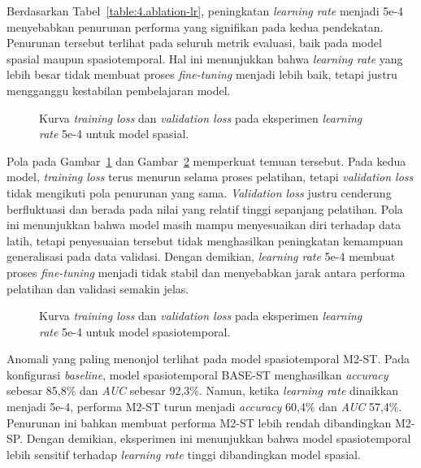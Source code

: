 Berdasarkan Tabel~\ref{table:4.ablation-lr}, peningkatan \textit{learning rate} menjadi 5e-4 menyebabkan penurunan performa yang signifikan pada kedua pendekatan. Penurunan tersebut terlihat pada seluruh metrik evaluasi, baik pada model spasial maupun spasiotemporal. Hal ini menunjukkan bahwa \textit{learning rate} yang lebih besar tidak membuat proses \textit{fine-tuning} menjadi lebih baik, tetapi justru mengganggu kestabilan pembelajaran model.

\begin{figure}[htbp]
\centering
{}
\caption{Kurva \textit{training loss} dan \textit{validation loss} pada eksperimen \textit{learning rate} 5e-4 untuk model spasial.}
\label{fig:4.ablation-lr-loss-spatial}
\end{figure}

Pola pada Gambar~\ref{fig:4.ablation-lr-loss-spatial} dan Gambar~\ref{fig:4.ablation-lr-loss-spatiotemporal} memperkuat temuan tersebut. Pada kedua model, \textit{training loss} terus menurun selama proses pelatihan, tetapi \textit{validation loss} tidak mengikuti pola penurunan yang sama. \textit{Validation loss} justru cenderung berfluktuasi dan berada pada nilai yang relatif tinggi sepanjang pelatihan. Pola ini menunjukkan bahwa model masih mampu menyesuaikan diri terhadap data latih, tetapi penyesuaian tersebut tidak menghasilkan peningkatan kemampuan generalisasi pada data validasi. Dengan demikian, \textit{learning rate} 5e-4 membuat proses \textit{fine-tuning} menjadi tidak stabil dan menyebabkan jarak antara performa pelatihan dan validasi semakin jelas.

\begin{figure}[htbp]
\centering
{}
\caption{Kurva \textit{training loss} dan \textit{validation loss} pada eksperimen \textit{learning rate} 5e-4 untuk model spasiotemporal.}
\label{fig:4.ablation-lr-loss-spatiotemporal}
\end{figure}

Anomali yang paling menonjol terlihat pada model spasiotemporal M2-ST. Pada konfigurasi \textit{baseline}, model spasiotemporal BASE-ST menghasilkan \textit{accuracy} sebesar 85,8\% dan \textit{AUC} sebesar 92,3\%. Namun, ketika \textit{learning rate} dinaikkan menjadi 5e-4, performa M2-ST turun menjadi \textit{accuracy} 60,4\% dan \textit{AUC} 57,4\%. Penurunan ini bahkan membuat performa M2-ST lebih rendah dibandingkan M2-SP. Dengan demikian, eksperimen ini menunjukkan bahwa model spasiotemporal lebih sensitif terhadap \textit{learning rate} tinggi dibandingkan model spasial.

